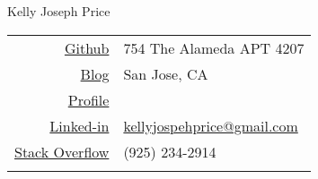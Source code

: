 \documentclass{article}
\begin{document}
\thispagestyle{empty} 

\center \huge{Kelly Joseph Price}
\normalsize

\hspace{.5cm}

{
    \centering
    \footnotesize
    \begin{tabular}{rl}
        \href{https://github.com/kellyjosephprice}{Github}
        &
        754 The Alameda APT 4207
        \\
        \href{http://kellyjosephprice.tumblr.com}{Blog}
        &
        San Jose, CA
        \\
        \href{http://kellyjosephprice.github.io}{Profile}
        &
        \\
        \href{https://www.linkedin.com/pub/kelly-price/22/760/a11}{Linked-in}
        &
        \href{mailto:kellyjosephprice@gmail.com}{kellyjospehprice@gmail.com}
        \\
        \href{https://careers.stackoverflow.com/kellyjosephprice}{Stack Overflow}
        &
        (925) 234-2914
        \\\\
    \end{tabular}
}
\end{document}
